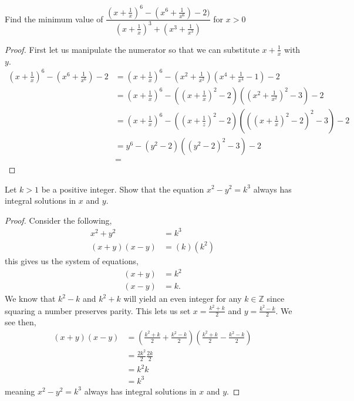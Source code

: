 \documentclass[11pt]{article}
\newenvironment{problem}[2][Problem\!]{\begin{trivlist}
\item[\hskip \labelsep {\bfseries #1}\hskip \labelsep {\bfseries #2}]}{\end{trivlist}}
\newcommand{\zz}{\mathbb Z}   %
\begin{document}
\begin{tcolorbox}
    \begin{problem} {IC | 12/03 | PP 41.}
        Find the minimum value of $\dfrac{(x+\frac{1}{x})^{6} - (x^{6}+\frac{1}{x^{6}}) -2)}{(x+\frac{1}{x})^{3} + (x^{3} + \frac{1}{x^{3}})}$ for $x > 0$
    \end{problem}
\end{tcolorbox}
\begin{proof}
    First let us manipulate the numerator so that we can substitute $x + \frac{1}{x}$ with $y$.
    \begin{align}
        (x+\frac{1}{x})^{6} - (x^{6} + \frac{1}{x^{6}}) -2 &= (x+ \frac{1}{x})^{6} - (x^{2} + \frac{1}{x^{2}})(x^{4} + \frac{1}{x^{4}} - 1) - 2 \\
        &= (x + \frac{1}{x})^{6} - ((x + \frac{1}{x})^{2}-2)((x^{2} + \frac{1}{x^{2}})^{2} - 3) - 2 \\
        &= (x + \frac{1}{x})^{6} - ((x + \frac{1}{z})^{2} - 2)(((x + \frac{1}{x})^{2} - 2)^{2} -3) - 2 \\
        &= y^{6} - (y^{2} - 2)((y^{2}-2)^{2} - 3) - 2 \\
        &= 
    \end{align}
\end{proof}
\begin{tcolorbox}
  \begin{problem} {IC | 12-03 | PP 42}
    Let $k > 1$ be a positive integer. Show that the equation $x^{2} -y^{2} = k^{3}$
always has integral solutions in $x$ and $y$.
  \end{problem}
\end{tcolorbox}
\begin{proof}
    Consider the following,
    \begin{align*}
        x^{2} + y^{2} &= k^{3} \\
        (x+y)(x-y) &= (k)(k^{2})
    \end{align*}
    this gives us the system of equations,
    \begin{align*}
        (x+y) &= k^{2} \\
        (x-y) &= k.
    \end{align*}
    We know that $k^{2} - k$ and $k^{2} +k $ will yield an even integer for any $k \in \zz$ since squaring a number preserves parity. This lets us set $x = \frac{k^{2} + k}{2}$ and $y = \frac{k^{2} - k}{2}$. We see then,
    \begin{align}
        (x+y)(x-y) &= (\frac{k^{2} + k}{2} + \frac{k^{2} - k}{2})(\frac{k^{2} + k}{2} -\frac{k^{2} - k}{2}) \\
        &= \frac{2k^{2}}{2}\frac{2k}{2} \\
        &= k^{2}k\\
        &= k^{3}
    \end{align}
    meaning $x^{2}-y^{2} = k^{3}$ always has integral solutions in $x$ and $y$.
\end{proof}
\end{document}
